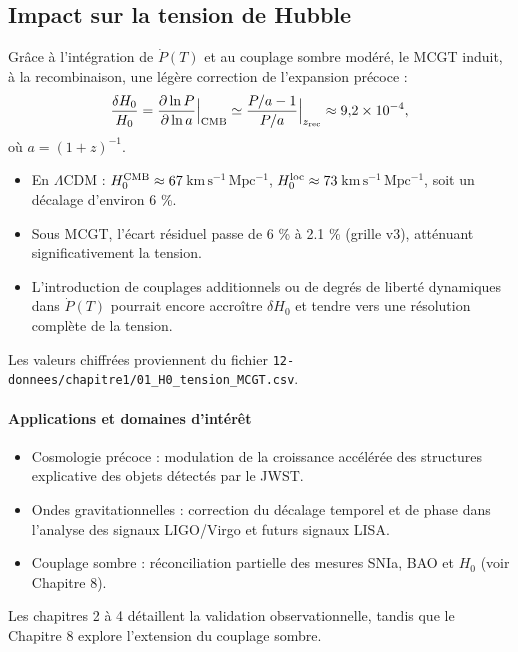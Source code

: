 \subsection{Impact sur la tension de Hubble}

Grâce à l’intégration de \(\dot P(T)\) et au couplage sombre modéré\cite{Smith2024_CouplageSombre}, le MCGT induit, à la recombinaison, une légère correction de l’expansion précoce :
\[
  \frac{\delta H_{0}}{H_{0}}
  = \Bigl.\frac{\partial \ln P}{\partial \ln a}\Bigr|_{\mathrm{CMB}}
  \simeq
  \Bigl.\frac{P/a - 1}{P/a}\Bigr|_{z_{\mathrm{rec}}}
  \approx 9{,}2\times10^{-4},
\]
où \(a=(1+z)^{-1}\).

\begin{itemize}
  \item En \(\Lambda\mathrm{CDM}\) :  
    \(H_{0}^{\rm CMB}\approx67\)\,\(\mathrm{km\,s^{-1}\,Mpc^{-1}}\),  
    \(H_{0}^{\rm loc}\approx73\)\,\(\mathrm{km\,s^{-1}\,Mpc^{-1}}\),  
    soit un décalage d’environ 6 \%.
  \item Sous MCGT, l’écart résiduel passe de 6 \% à 2.1 \% (grille v3),  
    atténuant significativement la tension.
  \item L’introduction de couplages additionnels ou de degrés de liberté dynamiques  
    dans \(\dot P(T)\) pourrait encore accroître \(\delta H_{0}\) et tendre vers  
    une résolution complète de la tension.
\end{itemize}

Les valeurs chiffrées proviennent du fichier  
\texttt{12-donnees/chapitre1/01\_H0\_tension\_MCGT.csv}.

\paragraph{Applications et domaines d’intérêt}  
\begin{itemize}
  \item Cosmologie précoce : modulation de la croissance accélérée des structures  
        explicative des objets détectés par le JWST.
  \item Ondes gravitationnelles : correction du décalage temporel et de phase  
        dans l’analyse des signaux LIGO/Virgo et futurs signaux LISA.
  \item Couplage sombre : réconciliation partielle des mesures SNIa, BAO  
        et \(H_{0}\) (voir Chapitre 8).
\end{itemize}

Les chapitres 2 à 4 détaillent la validation observationnelle,  
tandis que le Chapitre 8 explore l’extension du couplage sombre.  

